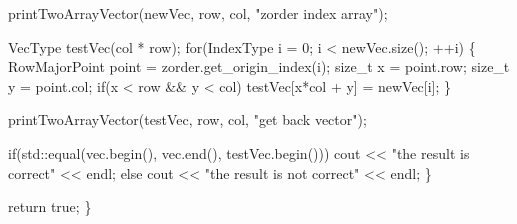 \begin{DoxyCodeInclude}
                printTwoArrayVector(newVec, row, col, \textcolor{stringliteral}{"zorder index array"});

                VecType testVec(col * row);
                \textcolor{keywordflow}{for}(IndexType i = 0; i < newVec.size(); ++i) \{
                        RowMajorPoint point = zorder.get\_origin\_index(i);
                        \textcolor{keywordtype}{size\_t} x = point.row;
                        \textcolor{keywordtype}{size\_t} y = point.col;
                        \textcolor{keywordflow}{if}(x < row && y < col) testVec[x*col + y] = newVec[i];
                \}

                printTwoArrayVector(testVec, row, col, \textcolor{stringliteral}{"get back vector"});

                \textcolor{keywordflow}{if}(std::equal(vec.begin(), vec.end(), testVec.begin()))
                        cout << \textcolor{stringliteral}{"the result is correct"} << endl;
                \textcolor{keywordflow}{else}
                        cout << \textcolor{stringliteral}{"the result is not correct"} << endl;
        \}

        \textcolor{keywordflow}{return} \textcolor{keyword}{true};
\}
\end{DoxyCodeInclude}
 